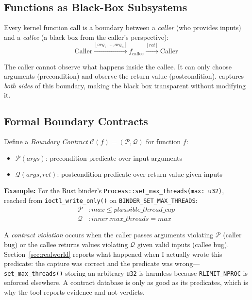 \documentclass{article}
\begin{document}
\subsection{Functions as Black-Box Subsystems}

Every kernel function call is a boundary between a \emph{caller} (who provides
inputs) and a \emph{callee} (a black box from the caller's perspective):
$$\text{Caller} \xrightarrow{[\mathit{arg}_1, \ldots, \mathit{arg}_n]}
  f_{\text{callee}} \xrightarrow{[\mathit{ret}]} \text{Caller}$$

The caller cannot observe what happens inside the callee. It can only choose
arguments (precondition) and observe the return value (postcondition).
\toolname{} captures \emph{both sides} of this boundary, making the black box
transparent without modifying it.

\subsection{Formal Boundary Contracts}

Define a \emph{Boundary Contract} $\mathcal{C}(f) = (\mathcal{P},
\mathcal{Q})$ for function $f$:
\begin{itemize}[nosep]
  \item $\mathcal{P}(\mathit{args})$: precondition predicate over input arguments
  \item $\mathcal{Q}(\mathit{args}, \mathit{ret})$: postcondition predicate
        over return value given inputs
\end{itemize}

\noindent\textbf{Example:} For the Rust binder's
\texttt{Process::set\_max\_threads(max: u32)}, reached from
\texttt{ioctl\_write\_only()} on \texttt{BINDER\_SET\_MAX\_THREADS}:
\begin{align*}
\mathcal{P}&: \mathit{max} \leq \mathit{plausible\_thread\_cap} \\
\mathcal{Q}&: \mathit{inner.max\_threads} = \mathit{max}
\end{align*}

A \emph{contract violation} occurs when the caller passes arguments violating
$\mathcal{P}$ (caller bug) or the callee returns values violating $\mathcal{Q}$
given valid inputs (callee bug). Section~\ref{sec:realworld} reports what
happened when I actually wrote this predicate: the capture was correct and the
predicate was wrong---\texttt{set\_max\_threads()} storing an arbitrary
\texttt{u32} is harmless because \texttt{RLIMIT\_NPROC} is enforced elsewhere.
A contract database is only as good as its predicates, which is why the tool
reports evidence and not verdicts.
\end{document}
